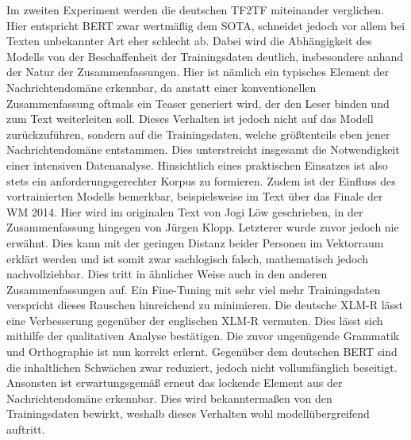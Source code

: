 \noindent
Im zweiten Experiment werden die deutschen \ac{TF2TF} miteinander verglichen. Hier entspricht \ac{BERT} zwar wertmäßig dem \ac{SOTA}, schneidet jedoch vor allem bei Texten unbekannter Art eher schlecht ab. Dabei wird die Abhängigkeit des Modells von der Beschaffenheit der Trainingsdaten deutlich, insbesondere anhand der Natur der Zusammenfassungen. Hier ist nämlich ein typisches Element der Nachrichtendomäne erkennbar, da anstatt einer konventionellen Zusammenfassung oftmals ein Teaser generiert wird, der den Leser binden und zum Text weiterleiten soll. Dieses Verhalten ist jedoch nicht auf das Modell zurückzuführen, sondern auf die Trainingsdaten, welche größtenteils eben jener Nachrichtendomäne entstammen. Dies unterstreicht insgesamt die Notwendigkeit einer intensiven Datenanalyse. Hinsichtlich eines praktischen Einsatzes ist also stets ein anforderungsgerechter Korpus zu formieren. Zudem ist der Einfluss des vortrainierten Modells bemerkbar, beispielsweise im Text über das Finale der WM 2014. Hier wird im originalen Text von Jogi Löw geschrieben, in der Zusammenfassung hingegen von Jürgen Klopp. Letzterer wurde zuvor jedoch nie erwähnt. Dies kann mit der geringen Distanz beider Personen im Vektorraum erklärt werden und ist somit zwar sachlogisch falsch, mathematisch jedoch nachvollziehbar. Dies tritt in ähnlicher Weise auch in den anderen Zusammenfassungen auf. Ein Fine-Tuning mit sehr viel mehr Trainingsdaten verspricht dieses Rauschen hinreichend zu minimieren. Die deutsche \ac{XLM-R} lässt eine Verbesserung gegenüber der englischen \ac{XLM-R} vermuten. Dies lässt sich mithilfe der qualitativen Analyse bestätigen. Die zuvor ungenügende Grammatik und Orthographie ist nun korrekt erlernt. Gegenüber dem deutschen \ac{BERT} sind die inhaltlichen Schwächen zwar reduziert, jedoch nicht vollumfänglich beseitigt. Ansonsten ist erwartungsgemäß erneut das lockende Element aus der Nachrichtendomäne erkennbar. Dies wird bekanntermaßen von den Trainingsdaten bewirkt, weshalb dieses Verhalten wohl modellübergreifend auftritt.\\

